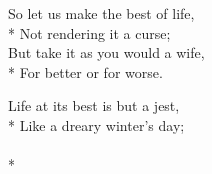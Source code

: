 \versemark
So let us make the best of life,\\*
Not rendering it a curse;\\
But take it as you would a wife,\\*
For better or for worse.

Life at its best is but a jest,\\*
Like a dreary winter’s day;\\
\\*
 

